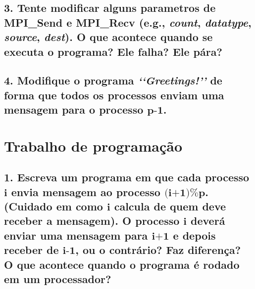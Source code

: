 \documentclass[11pt,a4paper]{article}
\begin{document}
\subsection*{3. Tente modificar alguns parametros de MPI\_Send e MPI\_Recv (e.g., \textit{count}, \textit{datatype}, \textit{source}, \textit{dest}). O que acontece quando se executa o programa? Ele falha? Ele pára?}
\subsection*{4. Modifique o programa \textit{\lq\lq{}Greetings!\rq\rq{}} de forma que todos os processos enviam uma mensagem para o processo $\textbf{p-1}$.}

\section*{Trabalho de programação}
\subsection*{1. Escreva um programa em que cada processo $\textbf{i}$ envia mensagem ao processo $\textbf{(i+1)\%p}$. (Cuidado em como $\textbf{i}$ calcula de quem deve receber a mensagem). O processo $\textbf{i}$ deverá enviar uma mensagem para $\textbf{i+1}$ e depois receber de $\textbf{i-1}$, ou o contrário? Faz diferença? O que acontece quando o programa é rodado em um processador?}
\end{document}
